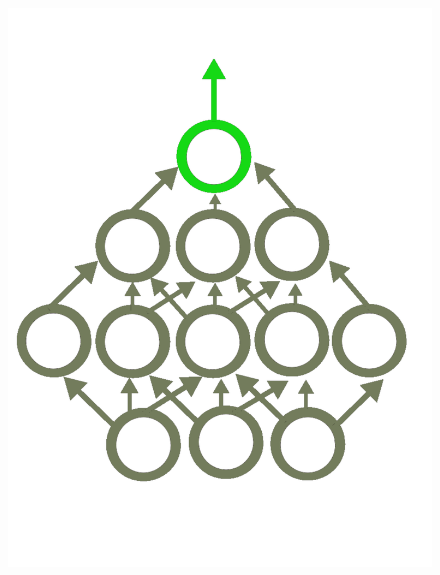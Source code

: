 \begin{figure}[!htb]
  \includegraphics[width=\linewidth]{./Images/Chapter03/frozen_net.pdf}
\endminipage\hfill
{}

\end{figure}
